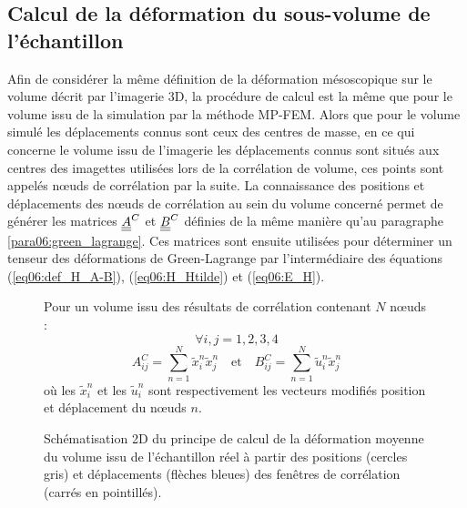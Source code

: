 	\subsection{Calcul de la déformation du sous-volume de l'échantillon}
		Afin de considérer la même définition de la déformation mésoscopique sur le volume décrit par l'imagerie 3D, la procédure de calcul est la même que pour le volume issu de la simulation par la méthode MP-FEM. Alors que pour le volume simulé les déplacements connus sont ceux des centres de masse, en ce qui concerne le volume issu de l'imagerie les déplacements connus sont situés aux centres des imagettes utilisées lors de la corrélation de volume, ces points sont appelés n\oe{}uds de corrélation par la suite. La connaissance des positions et déplacements des n\oe{}uds de corrélation au sein du volume concerné permet de générer les matrices $\underline{\underline{A}}^C$ et $\underline{\underline{B}}^C$ définies de la même manière qu'au paragraphe \ref{para06:green_lagrange}. Ces matrices sont ensuite utilisées pour déterminer un tenseur des déformations de Green-Lagrange par l'intermédiaire des équations (\ref{eq06:def_H_A-B}), (\ref{eq06:H_Htilde}) et (\ref{eq06:E_H}).
		\begin{figure}\centering
			\begin{minipage}{0.44\textwidth}\centering
			\end{minipage}
			\begin{minipage}{.55\textwidth}
				Pour un volume issu des résultats de corrélation contenant $N$ n\oe{}uds :
				$$ \forall i,j = 1,2,3,4 $$
				$$
				A_{ij}^C = \sum_{n=1}^{N} \tilde{x}_i^n\tilde{x}_j^n
				\quad\text{et}\quad
				B_{ij}^C = \sum_{n=1}^{N} \tilde{u}_i^n\tilde{x}_j^n
				$$
				où les $\tilde{x}_i^n$ et les $\tilde{u}_i^n$ sont respectivement les vecteurs modifiés position et déplacement du n\oe{}uds $n$.
			\end{minipage}
			\caption{\label{fig06:deformation_moyenne_DVC}Schématisation 2D du principe de calcul de la déformation moyenne du volume issu de l'échantillon réel à partir des positions (cercles gris) et déplacements (flèches bleues) des fenêtres de corrélation (carrés en pointillés).}
		\end{figure}

